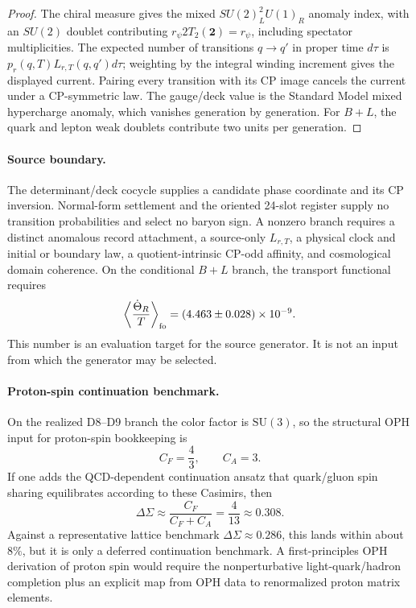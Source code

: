 \begin{proof}
The chiral measure gives the mixed \(SU(2)_L^2U(1)_R\) anomaly index, with an
\(SU(2)\) doublet contributing \(r_\psi2T_2(\mathbf2)=r_\psi\), including
spectator multiplicities. The expected number of transitions \(q\to q'\) in
proper time \(d\tau\) is \(p_r(q,T)L_{r,T}(q,q')d\tau\); weighting by the
integral winding increment gives the displayed current. Pairing every
transition with its CP image cancels the current under a CP-symmetric law.
The gauge/deck value is the Standard Model mixed hypercharge anomaly, which
vanishes generation by generation. For \(B+L\), the quark and lepton weak
doublets contribute two units per generation.
\end{proof}

\paragraph{Source boundary.}
The determinant/deck cocycle supplies a candidate phase coordinate and its CP
inversion. Normal-form settlement and the oriented 24-slot register supply no
transition probabilities and select no baryon sign. A nonzero branch requires
a distinct anomalous record attachment, a source-only \(L_{r,T}\), a physical
clock and initial or boundary law, a quotient-intrinsic CP-odd affinity, and
cosmological domain coherence. On the conditional \(B+L\) branch, the
transport functional requires
\[
\left\langle\frac{\dot\Theta_R}{T}\right\rangle_{\rm fo}
=(4.463\pm0.028)\times10^{-9}.
\]
This number is an evaluation target for the source generator. It is not an
input from which the generator may be selected.

\paragraph{Proton-spin continuation benchmark.}
On the realized D8--D9 branch the color factor is \(\mathrm{SU}(3)\), so the structural OPH
input for proton-spin bookkeeping is
\[
C_F=\frac43,
\qquad
C_A=3.
\]
If one adds the QCD-dependent continuation ansatz that quark/gluon spin sharing equilibrates
according to these Casimirs, then
\[
\Delta\Sigma\approx \frac{C_F}{C_F+C_A}=\frac{4}{13}\approx 0.308.
\]
Against a representative lattice benchmark \(\Delta\Sigma\approx 0.286\), this lands within about
\(8\%\), but it is only a deferred continuation benchmark. A first-principles OPH derivation of
proton spin would require the nonperturbative light-quark/hadron completion plus an explicit map
from OPH data to renormalized proton matrix elements.

